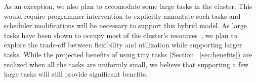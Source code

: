 As an exception, we also plan to accomodate some large tasks in the cluster.
This would require programmer intervention to explicitly annontate such tasks
and scheduler modifications will be necessary to support this hybrid model.  As
large tasks have been shown to occupy most of the cluster's
resources~\cite{something}, we plan to explore the trade-off between flexibility
and utilization while supporting larger tasks.  While the projected benefits of
using tiny tasks (Section ~\ref{sec:benefits}) are realized when all the tasks
are uniformly small, we believe that supporting a few large tasks will still
provide significant benefits.



